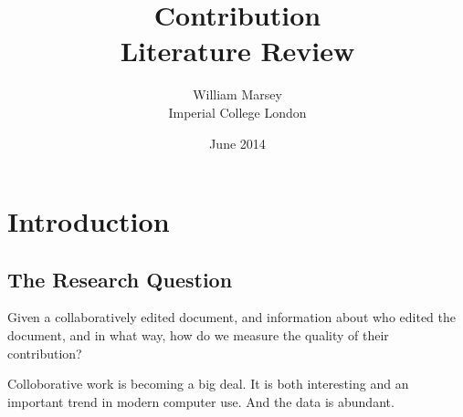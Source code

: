 \documentclass[a4paper,11pt,twoside,notitlepage]{article}
\renewenvironment{abstract}
 {
	\small
  	\begin{center}
  	\bfseries \abstractname\vspace{-.5em}\vspace{0pt}
  	\end{center}
  	\list{}{
    	\setlength{\leftmargin}{.5cm}%
    	\setlength{\rightmargin}{\leftmargin}%
  	}%
  	\item\relax}
 	{\endlist}
\begin{document}
	\title{Contribution
		\\ \small Literature Review}
	\author{William Marsey
		\\Imperial College London}
	\date{June 2014}
 	\maketitle
	

	

	

        \section{Introduction}
        \subsection{The Research Question}
        Given a collaboratively edited document, and information about
        who edited the document, and in what way, how do we measure
        the quality of their contribution?

        Colloborative work is becoming a big deal. It is both
        interesting and an important trend in modern computer
        use. And the data is abundant. 
\end{document}
